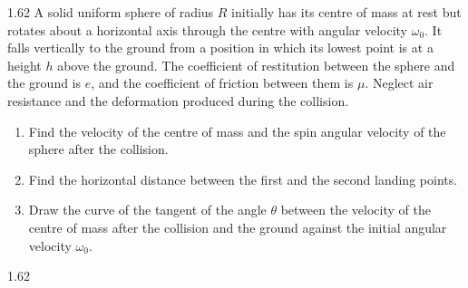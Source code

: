 \begin{problem}{1.62}
A solid uniform sphere of radius $R$ initially has its centre of mass at rest but rotates about a horizontal axis through the centre with angular velocity $\omega_0$. It falls vertically to the ground from a position in which its lowest point is at a height $h$ above the ground. The coefficient of restitution between the sphere and the ground is $e$, and the coefficient of friction between them is $\mu$. Neglect air resistance and the deformation produced during the collision.
\begin{enumerate}[label=(\arabic*),leftmargin=2.2em,itemsep=1pt,topsep=2pt]
\item Find the velocity of the centre of mass and the spin angular velocity of the sphere after the collision.
\item Find the horizontal distance between the first and the second landing points.
\item Draw the curve of the tangent of the angle $\theta$ between the velocity of the centre of mass after the collision and the ground against the initial angular velocity $\omega_0$.
\end{enumerate}
\end{problem}

\begin{figbox}{1.62}
\end{figbox}

